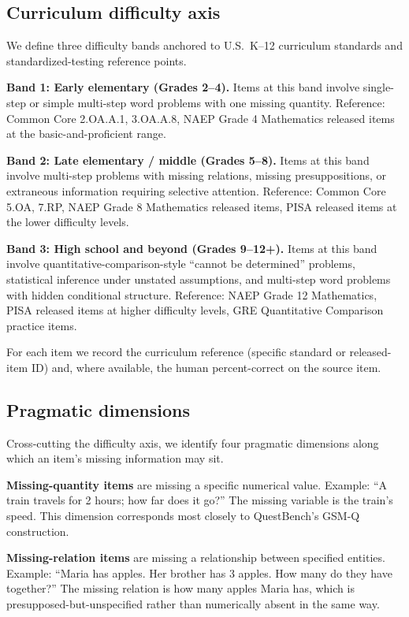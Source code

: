 \documentclass[11pt,letterpaper]{article}
\begin{document}
\subsection{Curriculum difficulty axis}

We define three difficulty bands anchored to U.S.\ K--12 curriculum standards and standardized-testing reference points.

\textbf{Band 1: Early elementary (Grades 2--4).} Items at this band involve single-step or simple multi-step word problems with one missing quantity. Reference: Common Core 2.OA.A.1, 3.OA.A.8, NAEP Grade 4 Mathematics released items at the basic-and-proficient range.

\textbf{Band 2: Late elementary / middle (Grades 5--8).} Items at this band involve multi-step problems with missing relations, missing presuppositions, or extraneous information requiring selective attention. Reference: Common Core 5.OA, 7.RP, NAEP Grade 8 Mathematics released items, PISA released items at the lower difficulty levels.

\textbf{Band 3: High school and beyond (Grades 9--12+).} Items at this band involve quantitative-comparison-style ``cannot be determined'' problems, statistical inference under unstated assumptions, and multi-step word problems with hidden conditional structure. Reference: NAEP Grade 12 Mathematics, PISA released items at higher difficulty levels, GRE Quantitative Comparison practice items.

For each item we record the curriculum reference (specific standard or released-item ID) and, where available, the human percent-correct on the source item.

\subsection{Pragmatic dimensions}

Cross-cutting the difficulty axis, we identify four pragmatic dimensions along which an item's missing information may sit.

\textbf{Missing-quantity items} are missing a specific numerical value. Example: ``A train travels for 2 hours; how far does it go?'' The missing variable is the train's speed. This dimension corresponds most closely to QuestBench's GSM-Q construction.

\textbf{Missing-relation items} are missing a relationship between specified entities. Example: ``Maria has apples. Her brother has 3 apples. How many do they have together?'' The missing relation is how many apples Maria has, which is presupposed-but-unspecified rather than numerically absent in the same way.
\end{document}
